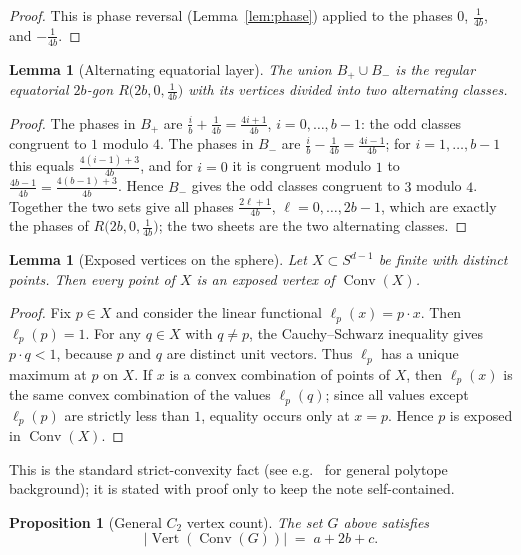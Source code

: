 \documentclass[11pt]{article}
\newtheorem{lemma}[theorem]{Lemma}
\newtheorem{proposition}[theorem]{Proposition}
\theoremstyle{definition}
\theoremstyle{remark}
\newcommand{\Vertset}{\operatorname{Vert}}
\newcommand{\Conv}{\operatorname{Conv}}
\newcommand{\Ctwo}{C_2}
\begin{document}
\begin{proof}
This is phase reversal (Lemma~\ref{lem:phase}) applied to the phases $0$,
$\tfrac{1}{4b}$, and $-\tfrac{1}{4b}$.
\end{proof}

\begin{lemma}[Alternating equatorial layer]\label{lem:alt}
The union $B_+\cup B_-$ is the regular equatorial $2b$-gon
$R\bigl(2b,0,\tfrac{1}{4b}\bigr)$ with its vertices divided into two
alternating classes.
\end{lemma}

\begin{proof}
The phases in $B_+$ are $\tfrac{i}{b}+\tfrac{1}{4b}=\tfrac{4i+1}{4b}$,
$i=0,\dots,b-1$: the odd classes congruent to $1$ modulo $4$. The phases
in $B_-$ are $\tfrac{i}{b}-\tfrac{1}{4b}=\tfrac{4i-1}{4b}$; for
$i=1,\dots,b-1$ this equals $\tfrac{4(i-1)+3}{4b}$, and for $i=0$ it is
congruent modulo $1$ to $\tfrac{4b-1}{4b}=\tfrac{4(b-1)+3}{4b}$. Hence
$B_-$ gives the odd classes congruent to $3$ modulo $4$. Together the two
sets give all phases $\tfrac{2\ell+1}{4b}$, $\ell=0,\dots,2b-1$, which are
exactly the phases of $R\bigl(2b,0,\tfrac1{4b}\bigr)$; the two sheets are
the two alternating classes.
\end{proof}

\begin{lemma}[Exposed vertices on the sphere]\label{lem:exposed}
Let $X\subset S^{d-1}$ be finite with distinct points. Then every point of
$X$ is an exposed vertex of $\Conv(X)$.
\end{lemma}

\begin{proof}
Fix $p\in X$ and consider the linear functional $\ell_p(x)=p\cdot x$. Then
$\ell_p(p)=1$. For any $q\in X$ with $q\ne p$, the Cauchy--Schwarz
inequality gives $p\cdot q<1$, because $p$ and $q$ are distinct unit
vectors. Thus $\ell_p$ has a unique maximum at $p$ on $X$. If $x$ is a
convex combination of points of $X$, then $\ell_p(x)$ is the same convex
combination of the values $\ell_p(q)$; since all values except
$\ell_p(p)$ are strictly less than $1$, equality occurs only at $x=p$.
Hence $p$ is exposed in $\Conv(X)$.
\end{proof}

This is the standard strict-convexity fact (see e.g.\ \cite{ziegler} for
general polytope background); it is stated with proof only to keep the
note self-contained.

\begin{proposition}[General $\Ctwo$ vertex count]\label{prop:count}
The set $G$ above satisfies
\[
|\Vertset(\Conv(G))| \;=\; a+2b+c .
\]
\end{proposition}
\end{document}
